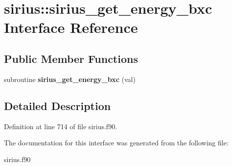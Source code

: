 \hypertarget{interfacesirius_1_1sirius__get__energy__bxc}{}\section{sirius\+:\+:sirius\+\_\+get\+\_\+energy\+\_\+bxc Interface Reference}
\label{interfacesirius_1_1sirius__get__energy__bxc}
\subsection*{Public Member Functions}
\begin{DoxyCompactItemize}
\item 
\hypertarget{interfacesirius_1_1sirius__get__energy__bxc_a1932f41c9fe9c2e370865a809f1499e8}{}subroutine {\bfseries sirius\+\_\+get\+\_\+energy\+\_\+bxc} (val)\label{interfacesirius_1_1sirius__get__energy__bxc_a1932f41c9fe9c2e370865a809f1499e8}

\end{DoxyCompactItemize}


\subsection{Detailed Description}


Definition at line 714 of file sirius.\+f90.



The documentation for this interface was generated from the following file\+:\begin{DoxyCompactItemize}
\item 
sirius.\+f90\end{DoxyCompactItemize}

